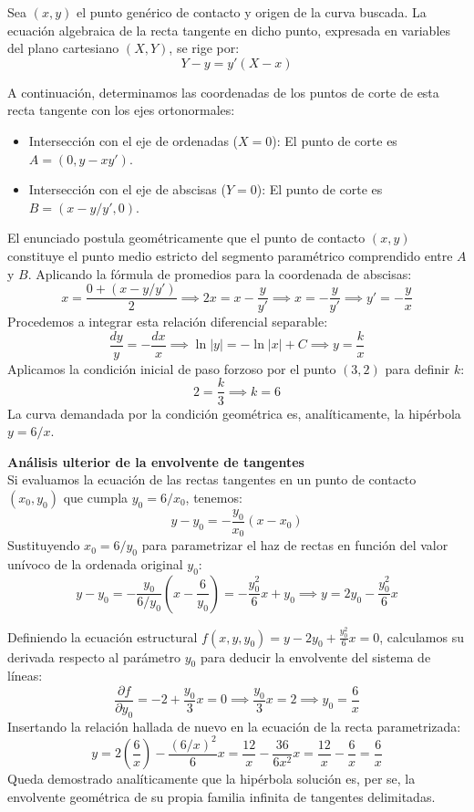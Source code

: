 \begin{tcolorbox}
Sea $(x,y)$ el punto genérico de contacto y origen de la curva buscada. La ecuación algebraica de la recta tangente en dicho punto, expresada en variables del plano cartesiano $(X, Y)$, se rige por:
$$ Y - y = y'(X - x) $$

A continuación, determinamos las coordenadas de los puntos de corte de esta recta tangente con los ejes ortonormales:
\begin{itemize}
    \item Intersección con el eje de ordenadas ($X = 0$): El punto de corte es $A = (0, y - xy')$.
    \item Intersección con el eje de abscisas ($Y = 0$): El punto de corte es $B = (x - y/y', 0)$.
\end{itemize}

El enunciado postula geométricamente que el punto de contacto $(x,y)$ constituye el punto medio estricto del segmento paramétrico comprendido entre $A$ y $B$. Aplicando la fórmula de promedios para la coordenada de abscisas:
$$ x = \frac{0 + (x - y/y')}{2} \implies 2x = x - \frac{y}{y'} \implies x = -\frac{y}{y'} \implies y' = -\frac{y}{x} $$
Procedemos a integrar esta relación diferencial separable:
$$ \frac{dy}{y} = -\frac{dx}{x} \implies \ln|y| = -\ln|x| + C \implies y = \frac{k}{x} $$
Aplicamos la condición inicial de paso forzoso por el punto $(3, 2)$ para definir $k$:
$$ 2 = \frac{k}{3} \implies k = 6 $$
La curva demandada por la condición geométrica es, analíticamente, la hipérbola $y = 6/x$.

\textbf{Análisis ulterior de la envolvente de tangentes}
\\
Si evaluamos la ecuación de las rectas tangentes en un punto de contacto $(x_0, y_0)$ que cumpla $y_0 = 6/x_0$, tenemos:
$$ y - y_0 = -\frac{y_0}{x_0}(x - x_0) $$
Sustituyendo $x_0 = 6/y_0$ para parametrizar el haz de rectas en función del valor unívoco de la ordenada original $y_0$:
$$ y - y_0 = -\frac{y_0}{6/y_0}\left(x - \frac{6}{y_0}\right) = -\frac{y_0^2}{6}x + y_0 \implies y = 2y_0 - \frac{y_0^2}{6}x $$

Definiendo la ecuación estructural $f(x,y,y_0) = y - 2y_0 + \frac{y_0^2}{6}x = 0$, calculamos su derivada respecto al parámetro $y_0$ para deducir la envolvente del sistema de líneas:
$$ \frac{\partial f}{\partial y_0} = -2 + \frac{y_0}{3}x = 0 \implies \frac{y_0}{3}x = 2 \implies y_0 = \frac{6}{x} $$
Insertando la relación hallada de nuevo en la ecuación de la recta parametrizada:
$$ y = 2\left(\frac{6}{x}\right) - \frac{(6/x)^2}{6}x = \frac{12}{x} - \frac{36}{6x^2}x = \frac{12}{x} - \frac{6}{x} = \frac{6}{x} $$
Queda demostrado analíticamente que la hipérbola solución es, per se, la envolvente geométrica de su propia familia infinita de tangentes delimitadas.


\end{tcolorbox}
